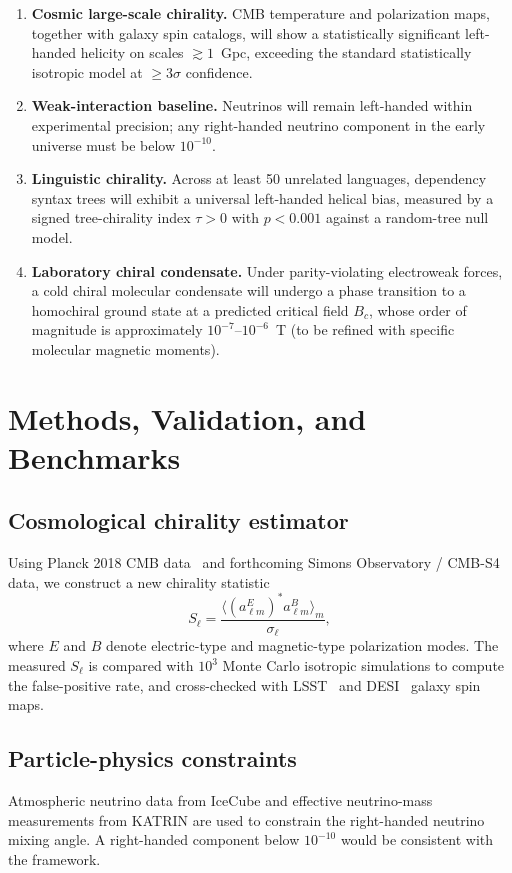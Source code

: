 \documentclass[10pt,a4paper]{article}
\begin{document}
\begin{enumerate}
\item \textbf{Cosmic large-scale chirality.} CMB temperature and polarization maps, together with galaxy spin catalogs, will show a statistically significant left-handed helicity on scales $\gtrsim 1$~Gpc, exceeding the standard statistically isotropic model at $\ge 3\sigma$ confidence.
\item \textbf{Weak-interaction baseline.} Neutrinos will remain left-handed within experimental precision; any right-handed neutrino component in the early universe must be below $10^{-10}$.
\item \textbf{Linguistic chirality.} Across at least 50 unrelated languages, dependency syntax trees will exhibit a universal left-handed helical bias, measured by a signed tree-chirality index $\tau>0$ with $p<0.001$ against a random-tree null model.
\item \textbf{Laboratory chiral condensate.} Under parity-violating electroweak forces, a cold chiral molecular condensate will undergo a phase transition to a homochiral ground state at a predicted critical field $B_c$, whose order of magnitude is approximately $10^{-7}$--$10^{-6}$~T (to be refined with specific molecular magnetic moments).
\end{enumerate}

\section*{Methods, Validation, and Benchmarks}
\subsection*{Cosmological chirality estimator}
Using Planck 2018 CMB data~\cite{Planck2018VI} and forthcoming Simons Observatory / CMB-S4 data, we construct a new chirality statistic
\begin{equation}
S_\ell = \frac{\langle (a_{\ell m}^E)^* a_{\ell m}^B\rangle_m}{\sigma_\ell},
\end{equation}
where $E$ and $B$ denote electric-type and magnetic-type polarization modes. The measured $S_\ell$ is compared with $10^3$ Monte Carlo isotropic simulations to compute the false-positive rate, and cross-checked with LSST~\cite{LSST2009} and DESI~\cite{DESI2016} galaxy spin maps.

\subsection*{Particle-physics constraints}
Atmospheric neutrino data from IceCube and effective neutrino-mass measurements from KATRIN are used to constrain the right-handed neutrino mixing angle. A right-handed component below $10^{-10}$ would be consistent with the framework.
\end{document}
